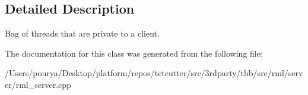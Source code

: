 \subsection{Detailed Description}
Bag of threads that are private to a client. 

The documentation for this class was generated from the following file\+:\begin{DoxyCompactItemize}
\item 
/\+Users/pourya/\+Desktop/platform/repos/tetcutter/src/3rdparty/tbb/src/rml/server/rml\+\_\+server.\+cpp\end{DoxyCompactItemize}
